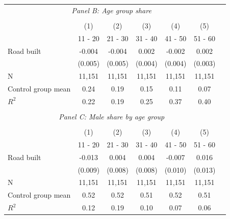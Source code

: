 \begin{tabular}{l*{6}{c}}
\\ \multicolumn{6}{c}{\textit{Panel B: Age group share}} \\\\ [-1ex] \hline            &\multicolumn{1}{c}{(1)} & \multicolumn{1}{c}{(2)} &\multicolumn{1}{c}{(3)}          &\multicolumn{1}{c}{(4)} &\multicolumn{1}{c}{(5)}  \\          &\multicolumn{1}{c}{11 - 20} &\multicolumn{1}{c}{21 - 30}          &\multicolumn{1}{c}{31 - 40} &\multicolumn{1}{c}{41 - 50}  &\multicolumn{1}{c}{51 - 60}  \\ \hline
Road built               &      -0.004   &      -0.004   &       0.002   &      -0.002   &       0.002   \\
                         &     (0.005)   &     (0.005)   &     (0.004)   &     (0.004)   &     (0.003)   \\
\hline
N                        &      11,151   &      11,151   &      11,151   &      11,151   &      11,151   \\
Control group mean       &        0.24   &        0.19   &        0.15   &        0.11   &        0.07   \\
$ R^{2} $                &        0.22   &        0.19   &        0.25   &        0.37   &        0.40   \\
\hline \\ \multicolumn{6}{c}{\textit{Panel C: Male share by age group}} \\\\ [-1ex] \hline            &\multicolumn{1}{c}{(1)} & \multicolumn{1}{c}{(2)} &\multicolumn{1}{c}{(3)}          &\multicolumn{1}{c}{(4)} &\multicolumn{1}{c}{(5)}  \\          &\multicolumn{1}{c}{11 - 20} &\multicolumn{1}{c}{21 - 30}          &\multicolumn{1}{c}{31 - 40} &\multicolumn{1}{c}{41 - 50}  &\multicolumn{1}{c}{51 - 60}  \\ \hline
Road built               &      -0.013   &       0.004   &       0.004   &      -0.007   &       0.016   \\
                         &     (0.009)   &     (0.008)   &     (0.008)   &     (0.010)   &     (0.013)   \\
\hline
N                        &      11,151   &      11,151   &      11,151   &      11,151   &      11,151   \\
Control group mean       &        0.52   &        0.52   &        0.51   &        0.52   &        0.51   \\
$ R^{2} $                &        0.12   &        0.19   &        0.10   &        0.07   &        0.06   \\
\hline\hline \end{tabular}
